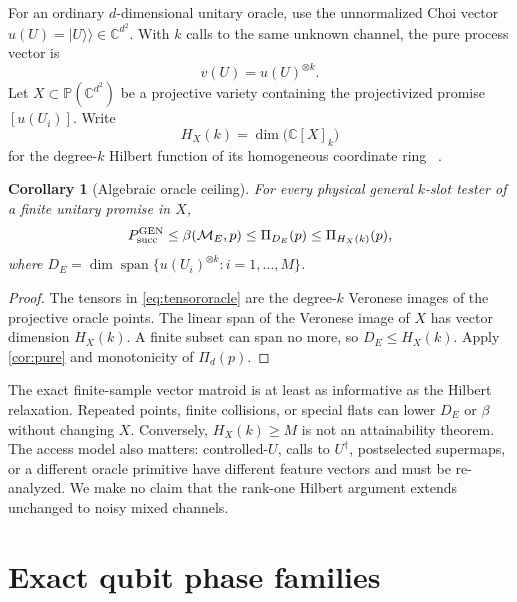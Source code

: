 \documentclass[11pt]{article}
\newtheorem{corollary}[theorem]{Corollary}
\theoremstyle{definition}
\theoremstyle{remark}
\newcommand{\C}{\mathbb C}
\newcommand{\PP}{\mathbb P}
\newcommand{\Span}{\operatorname{span}}
\newcommand{\cM}{\mathcal M}
\newcommand{\vket}[1]{\lvert #1\rangle\!\rangle}
\begin{document}
For an ordinary $d$-dimensional unitary oracle, use the unnormalized Choi
vector $u(U)=\vket{U}\in\C^{d^2}$.  With $k$ calls to the same unknown channel,
the pure process vector is
\begin{equation}
                              v(U)=u(U)^{\otimes k}.       \label{eq:tensororacle}
\end{equation}
Let $X\subset\PP(\C^{d^2})$ be a projective variety containing the
projectivized promise $[u(U_i)]$.  Write
\begin{equation}
                   H_X(k)=\dim\bigl(\C[X]_k\bigr)        \label{eq:hilbert}
\end{equation}
for the degree-$k$ Hilbert function of its homogeneous coordinate ring
~\cite{eisenbud1995}.

\begin{corollary}[Algebraic oracle ceiling]\label{cor:hilbert}
For every physical general $k$-slot tester of a finite unitary promise in
$X$,
\begin{equation}
 P_{\rm succ}^{\rm GEN}
 \leq\beta(\cM_E,p)
 \leq\Pi_{D_E}(p)
 \leq\Pi_{H_X(k)}(p),                                   \label{eq:hilbertbound}
\end{equation}
where
$D_E=\dim\Span\{u(U_i)^{\otimes k}:i=1,\ldots,M\}$.
\end{corollary}

\begin{proof}
The tensors in \cref{eq:tensororacle} are the degree-$k$ Veronese images of
the projective oracle points.  The linear span of the Veronese image of $X$
has vector dimension $H_X(k)$.  A finite subset can span no more, so
$D_E\leq H_X(k)$.  Apply \cref{cor:pure} and monotonicity of $\Pi_d(p)$.
\end{proof}

The exact finite-sample vector matroid is at least as informative as the
Hilbert relaxation.  Repeated points, finite collisions, or special flats can
lower $D_E$ or $\beta$ without changing $X$.  Conversely,
$H_X(k)\geq M$ is not an attainability theorem.  The access model also
matters: controlled-$U$, calls to $U^\dagger$, postselected supermaps, or a
different oracle primitive have different feature vectors and must be
re-analyzed.  We make no claim that the rank-one Hilbert argument extends
unchanged to noisy mixed channels.

\section{Exact qubit phase families}
\end{document}
